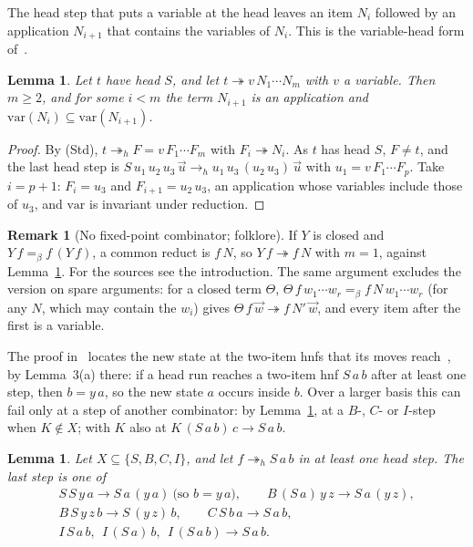 \documentclass[11pt]{amsart}
\newtheorem{lemma}[theorem]{Lemma}
\theoremstyle{definition}
\newtheorem{remark}[theorem]{Remark}
\newcommand{\red}{\twoheadrightarrow}
\newcommand{\hred}{\twoheadrightarrow_h}
\newcommand{\hstep}{\to_h}
\newcommand{\conv}{=_\beta}
\newcommand{\var}{\mathrm{var}}
\newcommand{\vw}{\vec w}
\begin{document}
The head step that puts a variable at the head leaves an item $N_i$ followed by an application
$N_{i+1}$ that contains the variables of $N_i$. This is the variable-head form
of~\citep[Lemma~3(a)]{s11}.

\begin{lemma}\label{lem:g2}
Let $t$ have head $S$, and let $t\red v\,N_1\cdots N_m$ with $v$ a variable. Then $m\ge2$, and for some
$i<m$ the term $N_{i+1}$ is an application and $\var(N_i)\subseteq\var(N_{i+1})$.
\end{lemma}

\begin{proof}
By (Std), $t\hred F=v\,F_1\cdots F_m$ with $F_i\red N_i$. As $t$ has head $S$, $F\ne t$, and the last
head step is $S\,u_1\,u_2\,u_3\,\vec u\hstep u_1\,u_3\,(u_2\,u_3)\,\vec u$ with $u_1=v\,F_1\cdots F_p$. Take
$i=p+1$: $F_i=u_3$ and $F_{i+1}=u_2\,u_3$, an application whose variables include those of $u_3$, and
$\var$ is invariant under reduction.
\end{proof}

\begin{remark}[No fixed-point combinator; folklore]\label{rem:fpc}
If $Y$ is closed and $Y\,f\conv f\,(Y\,f)$, a common reduct is $f\,N$, so $Y\,f\red f\,N$ with $m=1$,
against Lemma~\ref{lem:g2}. For the sources see the introduction. The same argument excludes the version
on spare arguments: for a closed term $\Theta$, $\Theta\,f\,w_1\cdots w_r\conv f\,N\,w_1\cdots w_r$ (for
any $N$, which may contain the $w_i$) gives $\Theta\,f\,\vw\red f\,N'\,\vw$, and every item after the first
is a variable.
\end{remark}

The proof in~\citep{s11} locates the new state at the two-item hnfs that its moves
reach~\citep[Lemma~4(B)]{s11}, by Lemma~3(a) there: if a head run reaches a two-item hnf $S\,a\,b$ after
at least one step, then $b=y\,a$, so the new state $a$ occurs inside $b$. Over a larger basis this can
fail only at a step of another combinator: by Lemma~\ref{lem:trace}, at a $B$-, $C$- or $I$-step when
$K\notin X$; with $K$ also at $K\,(S\,a\,b)\,c\to S\,a\,b$.

\begin{lemma}\label{lem:trace}
Let $X\subseteq\{S,B,C,I\}$, and let $f\hred S\,a\,b$ in at least one head step. The last step is one of
\begin{gather*}
S\,S\,y\,a\to S\,a\,(y\,a)\ \text{(so $b=y\,a$)},\qquad B\,(S\,a)\,y\,z\to S\,a\,(y\,z),\\
B\,S\,y\,z\,b\to S\,(y\,z)\,b,\qquad
C\,S\,b\,a\to S\,a\,b,\\
I\,S\,a\,b,\ \ I\,(S\,a)\,b,\ \ I\,(S\,a\,b)\to S\,a\,b.
\end{gather*}
\end{lemma}
\end{document}
